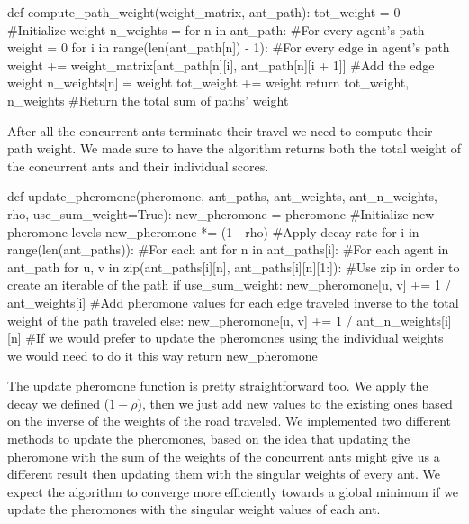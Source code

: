 \documentclass[titlepage]{article}
\begin{document}
\begin{python}
def compute_path_weight(weight_matrix, ant_path):
    tot_weight = 0 #Initialize weight
    n_weights = {}
    for n in ant_path: #For every agent's path
        weight = 0
        for i in range(len(ant_path[n]) - 1): #For every edge in agent's path
            weight += weight_matrix[ant_path[n][i], ant_path[n][i + 1]] #Add the edge weight
        n_weights[n] = weight
        tot_weight += weight
    return tot_weight, n_weights #Return the total sum of paths' weight
\end{python}

After all the concurrent ants terminate their travel we need to compute their path weight. We made sure to have the algorithm returns both the total weight of the concurrent ants and their individual scores.

\begin{python}
def update_pheromone(pheromone, ant_paths, ant_weights, ant_n_weights, rho, use_sum_weight=True):
    new_pheromone = pheromone #Initialize new pheromone levels
    new_pheromone *= (1 - rho) #Apply decay rate
    for i in range(len(ant_paths)): #For each ant
        for n in ant_paths[i]: #For each agent in ant_path
            for u, v in zip(ant_paths[i][n], ant_paths[i][n][1:]): #Use zip in order to create an iterable of the path
                if use_sum_weight:
                    new_pheromone[u, v] += 1 / ant_weights[i] #Add pheromone values for each edge traveled inverse to the total weight of the path traveled
                else:
                    new_pheromone[u, v] += 1 / ant_n_weights[i][n] #If we would prefer to update the pheromones using the individual weights we would need to do it this way
    return new_pheromone
\end{python}

The update pheromone function is pretty straightforward too. We apply the decay we defined ($1-\rho$), then we just add new values to the existing ones based on the inverse of the weights of the road traveled. We implemented two different methods to update the pheromones, based on the idea that updating the pheromone with the sum of the weights of the concurrent ants might give us a different result then updating them with the singular weights of every ant. We expect the algorithm to converge more efficiently towards a global minimum if we update the pheromones with the singular weight values of each ant.
\end{document}
